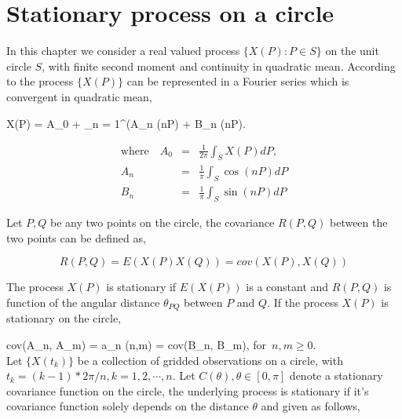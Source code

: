 
\section{Stationary process on a circle}

In this chapter we consider a real valued process $\{X(P): P\in S\}$ on the unit circle $S$, with finite second moment and continuity in quadratic mean. According to \cite{DUFOUR1976107} the process $\{X(P)\}$ can be represented in a Fourier series which is convergent in quadratic mean,

\beq
X(P) = A_0 + \sum_{n = 1}^\infty (A_n \cos(nP) + B_n \sin(nP).
\eeq


\begin{eqnarray}
	\nonumber
	\mbox{where} \quad A_0 &=&  \frac{1}{2\pi} \int_S X(P)dP, \\ \nonumber
	A_n &=& \frac{1}{\pi} \int_S \cos(nP)dP \\ 
	B_n &=& \frac{1}{\pi} \int_S \sin(nP)dP 
\end{eqnarray}

Let $P,Q$ be any two points on the circle, the covariance $R(P,Q)$ between the two points can be defined as,

\[
	R(P,Q) = E(X(P)X(Q)) = cov(X(P), X(Q))
\]

The process $X(P)$ is stationary if $E(X(P))$ is a constant and $R(P,Q)$ is function of the angular distance $\theta_{PQ}$ between $P$ and $Q$. If the process $X(P)$ is stationary on the circle,

\beq
cov(A_n, A_m) = a_n \delta(n,m) = cov(B_n, B_m), \quad \mbox{for $n, m \ge 0$}.
\eeq\\


Let $\{X(t_k)\}$ be a collection of gridded observations on a circle, with $t_k = (k-1)*2\pi/n, k = 1, 2, \cdots, n$. Let $C(\theta), \theta \in [0, \pi ]$ denote a stationary covariance function on the circle, the underlying process is stationary if it's covariance function solely depends on the distance $\theta$ and given as follows,

